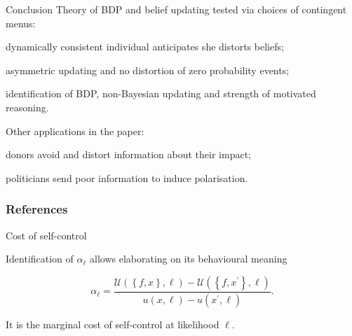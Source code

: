 \documentclass[usenames,dvipsnames,aspectratio=169,11pt]{beamer}
\begin{document}
\begin{frame}{Conclusion}
	Theory of BDP and belief updating tested via choices of contingent menus:
	\vfill

	\begin{wideitemize}
		\item dynamically consistent individual anticipates she distorts beliefs;
		\item asymmetric updating and no distortion of zero probability events;
		\item identification of BDP, non-Bayesian updating and strength of motivated reasoning.
	\end{wideitemize}

	\vfill

	Other applications in the paper:

	\vfill

	\begin{wideitemize}
		\item donors avoid and distort information about their impact;
		\item politicians send poor information to induce polarisation.
	\end{wideitemize}

\end{frame}

\begin{frame}

	\frametitle{References}

	
	


\end{frame}

\appendix

\begin{frame}{Cost of self-control}\label{alpha}

	Identification of \( \alpha_{\ell} \) allows elaborating on its behavioural meaning

	\vfill

	\[
		\alpha_{\ell} = \frac{\mathcal{U} \left( \left\{f, x \right\}, \ell \right) - \mathcal{U} \left( \left\{f, x^{\prime} \right\}, \ell \right) }{u \left( x , \ell \right) - u \left( x^{\prime} , \ell \right)} .
	\]

	\vfill

	It is the marginal cost of self-control at likelihood \( \ell \). \hyperlink{fullmodel}{}

\end{frame}
\end{document}
